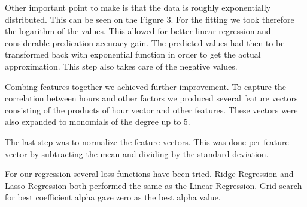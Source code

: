 \documentclass[a4paper, 11pt]{article}
\begin{document}
Other important point to make is that the data is roughly exponentially distributed. This can be seen on the Figure 3. For the fitting we took therefore the logarithm of the values. This allowed for better linear regression and considerable predication accuracy gain. The predicted values had then to be transformed back with exponential function in order to get the actual approximation. This step also takes care of the negative values.

Combing features together we achieved further improvement. To capture the correlation between hours and other factors we produced several feature vectors consisting of the products of hour vector and other features. These vectors were also expanded to monomials of the degree up to 5. 

The last step was to normalize the feature vectors. This was done per feature vector by subtracting the mean and dividing by the standard deviation.

For our regression several loss functions have been tried.
Ridge Regression and Lasso Regression both performed the same as the Linear Regression. Grid search for best coefficient alpha gave zero as the best alpha value. 
\end{document}
